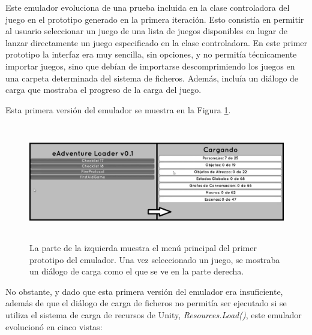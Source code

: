 Este emulador evoluciona de una prueba incluida en la clase controladora del juego en el prototipo generado en la primera iteración. Esto consistía en permitir al usuario seleccionar un juego de una lista de juegos disponibles en lugar de lanzar directamente un juego especificado en la clase controladora. En este primer prototipo la interfaz era muy sencilla, sin opciones, y no permitía técnicamente importar juegos, sino que debían de importarse descomprimiendo los juegos en una carpeta determinada del sistema de ficheros. Además, incluía un diálogo de carga que mostraba el progreso de la carga del juego.

Esta primera versión del emulador se muestra en la Figura \ref{betaemuit3}.

\begin{figure}[htb]
	\centerline{\includegraphics[height=2in]{figures/it3/betaemu.png}}
	\caption[Primer prototipo - Emulador]{La parte de la izquierda muestra el menú principal del primer prototipo del emulador. Una vez seleccionado un juego, se mostraba un diálogo de carga como el que se ve en la parte derecha.}
	\label{betaemuit3}
\end{figure}

No obstante, y dado que esta primera versión del emulador era insuficiente, además de que el diálogo de carga de ficheros no permitía ser ejecutado si se utiliza el sistema de carga de recursos de Unity, \textit{Resources.Load()}, este emulador evolucionó en cinco vistas:

